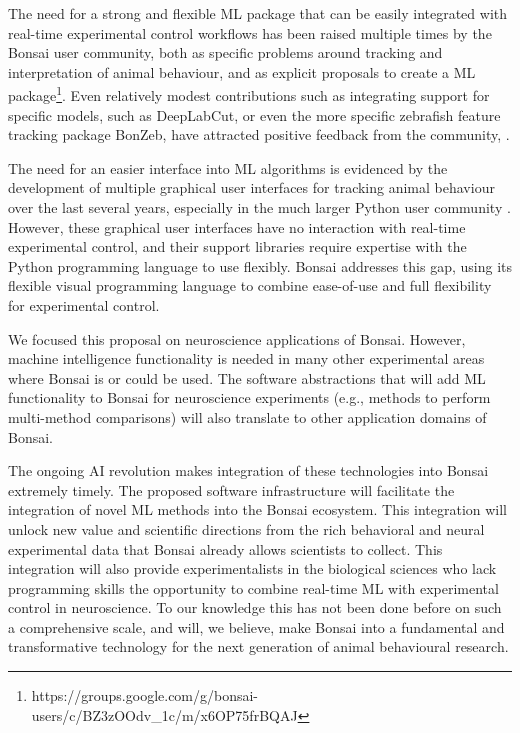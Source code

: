 The need for a strong and
flexible ML package that can be easily integrated with
real-time experimental control workflows has been raised multiple times by the
Bonsai user community, both as specific problems around 
tracking and interpretation of animal behaviour, and as 
explicit proposals to create a ML
package\footnote{https://groups.google.com/g/bonsai-users/c/BZ3zOOdv\_1c/m/x6OP75frBQAJ}. Even
relatively modest contributions such as integrating support for specific models, such as DeepLabCut, or even the more specific zebrafish feature
tracking package BonZeb, have attracted positive
feedback from the community, \citep[e.g.,][]{kaneEtAl20,guilbeaultEtAl21}.

The need for an easier interface into ML algorithms
is evidenced by the development of multiple graphical user interfaces for
tracking animal behaviour over the last several years, especially in the much
larger Python user community
\citep[e.g.,][]{walterAndCouzin21,guilbeaultEtAl21}. However, these graphical
user interfaces have no interaction with real-time experimental control, and
their support libraries require expertise with the Python programming language
to use flexibly. Bonsai addresses this gap, using its
flexible visual programming language to combine ease-of-use and full
flexibility for experimental control.

We focused this proposal on neuroscience applications of Bonsai. However, machine intelligence functionality is needed in many other
experimental areas where Bonsai is or could be used. The software
abstractions that will add ML
functionality to Bonsai for neuroscience experiments (e.g., methods to perform
multi-method comparisons) will also translate to other application domains of
Bonsai.

The ongoing AI revolution makes integration of these
technologies into Bonsai extremely timely. The proposed software infrastructure will facilitate the integration of novel ML methods into the Bonsai
ecosystem. This integration will unlock new value
and scientific directions from the rich behavioral and neural
experimental data that Bonsai already allows scientists to collect. This
integration will also provide experimentalists in the biological
sciences who lack programming skills the opportunity to combine real-time ML with
experimental control in neuroscience. To our knowledge
this has not been done before on such a comprehensive scale, and will, we believe, make Bonsai into a fundamental and transformative technology for
the next generation of animal behavioural research.

